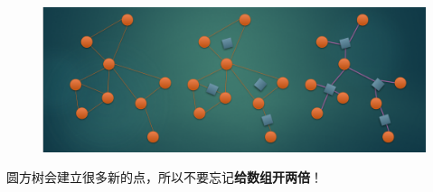 \begin{figure}[H]
    \centering
    \includegraphics[width=\columnwidth]{src/graph/圆方树.png}
\end{figure}
圆方树会建立很多新的点，所以不要忘记\textbf{给数组开两倍}！